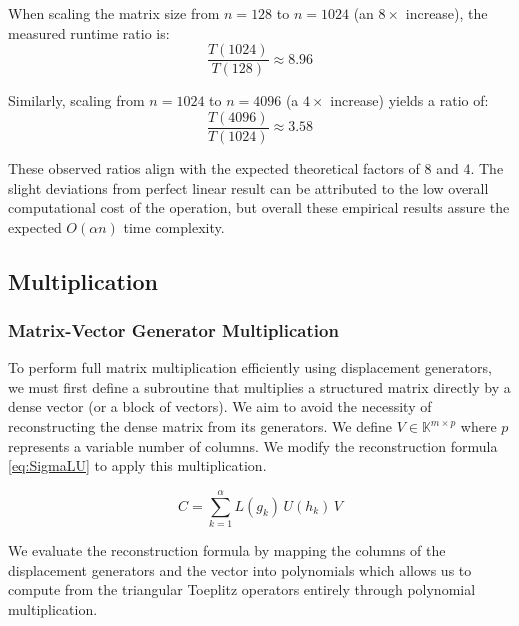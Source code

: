 When scaling the matrix size from $n=128$ to $n=1024$ (an $8\times$
increase), the measured runtime ratio is:
$$ \frac{T(1024)}{T(128)} \approx 8.96 $$

Similarly, scaling from $n=1024$ to $n=4096$ (a $4\times$ increase)
yields a ratio of:
$$ \frac{T(4096)}{T(1024)} \approx 3.58 $$

These observed ratios align with the expected theoretical factors of
8 and 4. The slight deviations from perfect linear result can
be attributed to the low overall computational cost of the
operation, but overall these empirical results
assure the expected $O(\alpha n)$ time complexity.

\subsection{Multiplication}

\subsubsection{Matrix-Vector Generator Multiplication}

To perform full matrix multiplication efficiently using displacement
generators, we must first define a subroutine that multiplies a
structured matrix directly by a dense vector (or a block of vectors).
We aim to avoid the necessity of reconstructing the dense matrix from
its generators.
We define $V \in \mathbb{K}^{m \times p}$ where $p$ represents a
variable number of columns. We modify the reconstruction formula
\ref{eq:SigmaLU} to apply this multiplication.

\begin{equation} \label{eq:SigmaLUV}
  C = \sum_{k=1}^{\alpha} L(g_k) \, U(h_k) \, V
\end{equation}

We evaluate the reconstruction formula by mapping
the columns of the displacement generators and the vector into
polynomials which allows us to compute from the triangular Toeplitz
operators entirely through polynomial multiplication.

